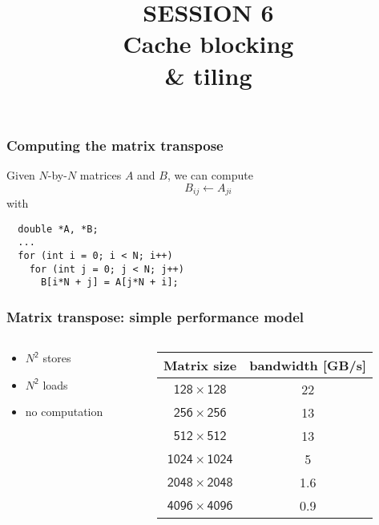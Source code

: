 \documentclass[dvipsnames,presentation,aspectratio=169,14pt]{beamer}
\date{}
\begin{document}
\title{\firasemibold\color{White}%
  {\fontsize{20}{0}\selectfont SESSION 6\\
    \fontsize{34}{34}\selectfont Cache blocking\\\& tiling\par}}
\titleslide

\begin{frame}[fragile]
\frametitle{Computing the matrix transpose}
Given $N$-by-$N$ matrices $A$ and $B$, we can compute
\begin{equation*}
  B_{ij} \gets A_{ji}
\end{equation*}
with
\begin{verbatim}
  double *A, *B;
  ...
  for (int i = 0; i < N; i++)
    for (int j = 0; j < N; j++)
      B[i*N + j] = A[j*N + i];
\end{verbatim}
\pause
\vskip 11pt


\end{frame}

\begin{frame}
  \frametitle{Matrix transpose: simple performance model}
  \begin{columns}
    \begin{column}{.4\textwidth}
      \begin{itemize}[wide=0pt,itemsep=14pt]
      \item $N^\mathsf{2}$ stores
      \item $N^\mathsf{2}$ loads
      \item no computation
      \end{itemize}
      \vskip 11pt

    \end{column}
    \pause
    \begin{column}{.55\textwidth}
      \begin{center}
        \begin{tabular}{cc}
          \toprule
          Matrix size & bandwidth [GB/s]\\
          \midrule
          $\mathsf{128\times 128}$ & 22\phantom{.6}\\
          $\mathsf{256 \times 256}$ & 13\phantom{.0}\\
          $\mathsf{512 \times 512}$ & 13\phantom{.0}\\
          $\mathsf{1024 \times 1024}$ & \phantom{0}5\phantom{.0}\\
          $\mathsf{2048 \times 2048}$ & \phantom{0}1.6\\
          $\mathsf{4096 \times 4096}$ & \phantom{0}0.9\\
          \bottomrule
        \end{tabular}
      \end{center}
    \end{column}
  \end{columns}
\end{frame}
\end{document}
